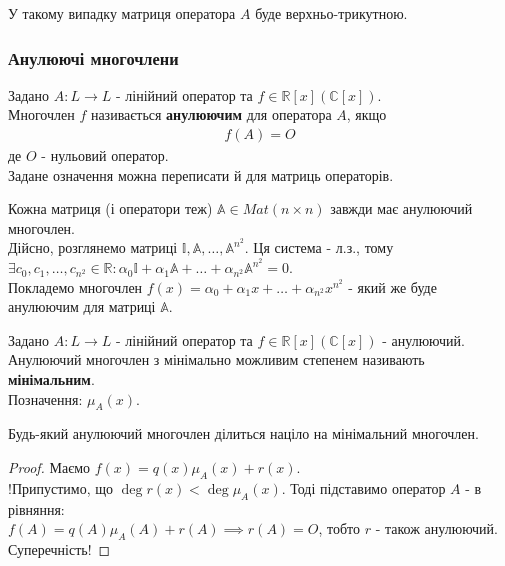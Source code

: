 \documentclass{math_library}
\begin{document}
\begin{corollary}
У такому випадку матриця оператора $A$ буде верхньо-трикутною.
\end{corollary}
\fi

\iffalse
\subsubsection*{Анулюючі многочлени}
\begin{definition}
Задано $A: L \to L$ - лінійний оператор та $f \in \mathbb{R}[x] (\mathbb{C}[x])$.\\
Многочлен $f$ називається \textbf{анулюючим} для оператора $A$, якщо
\begin{align*}
f(A) = O
\end{align*}
де $O$ - нульовий оператор.\\
Задане означення можна переписати й для матриць операторів.
\end{definition}

\begin{remark}
Кожна матриця (і оператори теж) $\mathbb{A} \in Mat(n \times n)$ завжди має анулюючий многочлен.\\
Дійсно, розглянемо матриці $\mathbb{I}, \mathbb{A}, \dots, \mathbb{A}^{n^2}$. Ця система - л.з., тому\\
$\exists c_0,c_1,\dots,c_{n^2} \in \mathbb{R}: \alpha_0 \mathbb{I} + \alpha_1 \mathbb{A} + \dots + \alpha_{n^2} \mathbb{A}^{n^2} = 0$.\\
Покладемо многочлен $f(x) = \alpha_0 + \alpha_1 x + \dots + \alpha_{n^2}x^{n^2}$ - який же буде анулюючим для матриці $\mathbb{A}$.
\end{remark}

\begin{definition}
Задано $A: L \to L$ - лінійний оператор та $f \in \mathbb{R}[x] (\mathbb{C}[x])$ - анулюючий.\\
Анулюючий многочлен з мінімально можливим степенем називають \textbf{мінімальним}.\\
Позначення: $\mu_A(x)$.
\end{definition}

\begin{proposition}
Будь-який анулюючий многочлен ділиться націло на мінімальний многочлен.
\end{proposition}

\begin{proof}
Маємо $f(x) = q(x) \mu_A(x) + r(x)$.\\
!Припустимо, що $\deg r(x) < \deg \mu_A(x)$. Тоді підставимо оператор $A$ - в рівняння:\\
$f(A) = q(A) \mu_A(A) + r(A) \implies r(A) = O$, тобто $r$ - також анулюючий. Суперечність!
\end{proof}
\end{document}
